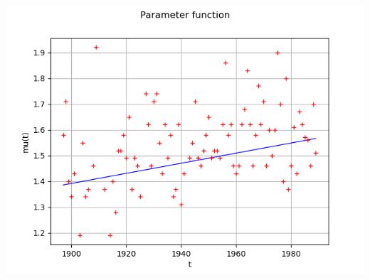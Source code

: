 \documentclass[aspectratio=169]{beamer}
\begin{document}
\begin{frame}[containsverbatim]
\begin{columns}
\centering
    \includegraphics[width=.9\textwidth]{figures/GEV4.png}
    
  \end{columns}

\end{frame}

\end{document}
